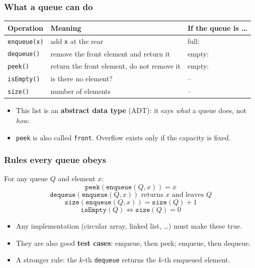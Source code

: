 \documentclass[aspectratio=169,10pt,compress]{beamer}
\begin{document}
\begin{frame}[t,fragile] \frametitle{What a queue can do}
  \begin{center}\small
  \begin{tabular}{lL{0.4\textwidth}L{0.32\textwidth}}
    \toprule
    \textbf{Operation}    & \textbf{Meaning}                                  & \textbf{If the queue is \dots} \\
    \midrule
    \texttt{enqueue(x)}   & add \texttt{x} at the rear                        & full:  \\
    \texttt{dequeue()}    & remove the front element and return it            & empty:  \\
    \texttt{peek()}       & return the front element, do not remove it        & empty:  \\
    \texttt{isEmpty()}    & is there no element?                              & -- \\
    \texttt{size()}       & number of elements                                & -- \\
    \bottomrule
  \end{tabular}
  \end{center}
  \vspace{0.5em}
  \begin{itemize}\small
    \item This list is an \textbf{abstract data type} (ADT): it says \emph{what} a queue does, not \emph{how}.
    \item \texttt{peek} is also called \texttt{front}. Overflow exists only if the capacity is fixed.
  \end{itemize}
\end{frame}




\begin{frame}[t,fragile] \frametitle{Rules every queue obeys}
  For any queue $Q$ and element $x$:
  \[
  	\texttt{peek}(\texttt{enqueue}(Q, x)) = x
  \]
  \[
  	\texttt{dequeue}(\texttt{enqueue}(Q, x)) \text{ returns } x \text{ and leaves } Q
  \]
  \[
  	\texttt{size}(\texttt{enqueue}(Q, x)) = \texttt{size}(Q) + 1
  \]
  \[
  	\texttt{isEmpty}(Q) \iff \texttt{size}(Q) = 0
  \]
  \vspace{0.3em}
  \begin{itemize}\small
    \item Any implementation (circular array, linked list, \dots) must make these true.
    \item They are also good \textbf{test cases}: enqueue, then peek; enqueue, then dequeue.
    \item A stronger rule: the $k$-th \texttt{dequeue} returns the $k$-th enqueued element.
  \end{itemize}
\end{frame}
\end{document}
